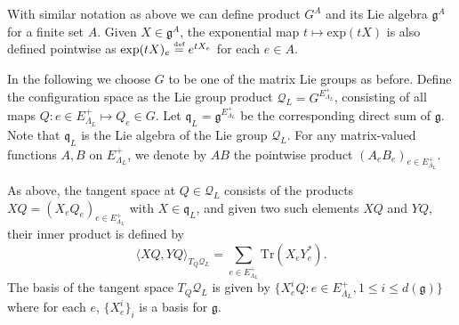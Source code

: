 \documentclass[11pt,UTF-8,reqno]{amsart}
\numberwithin{equation}{section}
\newcommand{\eqdef}{\stackrel{\mbox{\tiny def}}{=}}
\def\cQ{{\mathcal Q}}
\def\le{\leqslant}
\def\q{\mathfrak{q}}
\def\mfg{\mathfrak{g}}
\def\le{\leqslant}
\def\dg{d(\mfg)}
\begin{document}
With similar notation as above we can define product $G^A$ and its Lie algebra $\mfg^A$ for a finite set $A$.
 Given $X \in \mfg^A$, the exponential map $t \mapsto \text{exp}(tX)  $ is also defined pointwise as
 $\text{exp}(tX)_{e}\eqdef e^{tX_{e}}$ for each $e\in A$.

In the following we choose $G$ to be one of the matrix Lie groups as before.
Define the configuration space as the Lie group product  $\cQ_L=G^{E_{\Lambda_{L}}^+}$,
consisting of all maps $Q:e \in E_{\Lambda_{L}}^{+} \mapsto Q_{e} \in G$.
Let $\q_L=\mfg^{E_{\Lambda_{L}}^+}$ be the corresponding direct sum of $\mfg$.
Note that $\q_L$ is the Lie algebra of the Lie group $\cQ_L$.
For any matrix-valued functions $A,B$ on $E_{\Lambda_L}^+$, we denote by $AB $
the pointwise product $(A_e B_e)_{e\in E_{\Lambda_{L}}^+}$.

As above, the tangent space at $Q \in \mathcal{Q}_L$ consists of the products $XQ= (X_e Q_e)_{e\in E_{\Lambda_{L}}^+}$ with $X \in \q_L$,  and given two such elements $XQ$ and $YQ$, their inner product is defined by
\begin{equation}
	\langle XQ,YQ \rangle_{T_Q\cQ_L} = \sum_{e \in E_{\Lambda_{L}}^{+} } \text{Tr}(X_{e}Y_{e}^{*}) \nonumber.
\end{equation}
The basis of the tangent space $T_Q\cQ_L$ is given by $\{X_e^iQ : e\in E^+_{\Lambda_L} , 1 \le i \le \dg \}$
where for each $e$, $\{X_e^i\}_i$ is a basis for $\mfg$.
\end{document}

